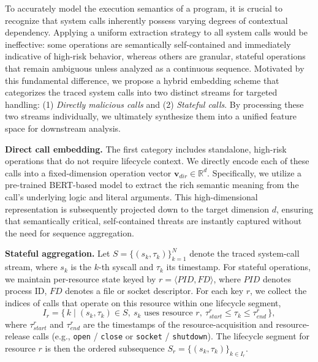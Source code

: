 To accurately model the execution semantics of a program, it is crucial to recognize that system calls inherently possess varying degrees of contextual dependency. Applying a uniform extraction strategy to all system calls would be ineffective: some operations are semantically self-contained and immediately indicative of high-risk behavior, whereas others are granular, stateful operations that remain ambiguous unless analyzed as a continuous sequence. Motivated by this fundamental difference, we propose a hybrid embedding scheme that categorizes the traced system calls into two distinct streams for targeted handling: (1) \emph{Directly malicious calls} and (2) \emph{Stateful calls}. By processing these two streams individually, we ultimately synthesize them into a unified feature space for downstream analysis.

\noindent \textbf{Direct call embedding.}
The first category includes standalone, high-risk operations that do not require lifecycle context. We directly encode each of these calls into a fixed-dimension operation vector $\mathbf{v}_{\textit{dir}} \in \mathbb{R}^{d}$. Specifically, we utilize a pre-trained BERT-based model to extract the rich semantic meaning from the call's underlying logic and literal arguments. This high-dimensional representation is subsequently projected down to the target dimension $d$, ensuring that semantically critical, self-contained threats are instantly captured without the need for sequence aggregation.

\noindent \textbf{Stateful aggregation.}
Let $S = \{(s_k, \tau_k)\}_{k=1}^{N}$ denote the traced system-call stream, where $s_k$ is the $k$-th syscall and $\tau_k$ its timestamp. For stateful operations, we maintain per-resource state keyed by $r = \langle \textit{PID}, \textit{FD} \rangle$, where $\textit{PID}$ denotes process ID, $\textit{FD}$ denotes a file or socket descriptor. For each key $r$, we collect the indices of calls that operate on this resource within one lifecycle segment,
\begin{equation}
I_r = \{\, k \mid (s_k, \tau_k) \in S,\ s_k \text{ uses resource } r,\ \tau_{\textit{start}}^r \le \tau_k \le \tau_{\textit{end}}^r \,\},
\end{equation}
where $\tau_{\textit{start}}^r$ and $\tau_{\textit{end}}^r$ are the timestamps of the resource-acquisition and resource-release calls (e.g., \texttt{open} / \texttt{close} or \texttt{socket} / \texttt{shutdown}). The lifecycle segment for resource $r$ is then the ordered subsequence $S_r = \{(s_k, \tau_k)\}_{k \in I_r}$.

